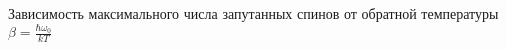 Зависимость максимального числа запутанных спинов от обратной температуры
$\beta = \frac{\hbar\omega_0}{kT} $
